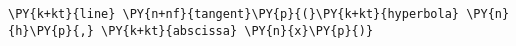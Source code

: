 \begin{Verbatim}[commandchars=\\\{\}]
    \PY{k+kt}{line} \PY{n+nf}{tangent}\PY{p}{(}\PY{k+kt}{hyperbola} \PY{n}{h}\PY{p}{,} \PY{k+kt}{abscissa} \PY{n}{x}\PY{p}{)}
\end{Verbatim}
